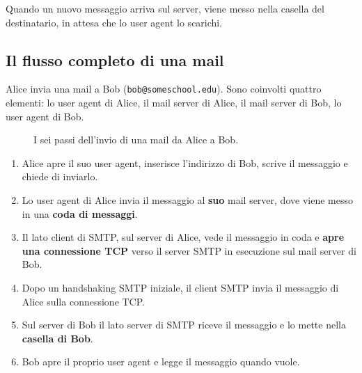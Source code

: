 Quando un nuovo messaggio arriva sul server, viene messo nella casella del destinatario, in attesa
che lo user agent lo scarichi.

\subsection{Il flusso completo di una mail}

Alice invia una mail a Bob (\texttt{bob@someschool.edu}). Sono coinvolti quattro elementi: lo user agent
di Alice, il mail server di Alice, il mail server di Bob, lo user agent di Bob.

\begin{figure}[H]
\centering
{}
\caption{I sei passi dell'invio di una mail da Alice a Bob.}
\end{figure}

\begin{enumerate}
    \item Alice apre il suo user agent, inserisce l'indirizzo di Bob, scrive il messaggio e chiede di inviarlo.
    \item Lo user agent di Alice invia il messaggio al \textbf{suo} mail server, dove viene messo in una
          \textbf{coda di messaggi}.
    \item Il lato client di SMTP, sul server di Alice, vede il messaggio in coda e \textbf{apre una connessione
          TCP} verso il server SMTP in esecuzione sul mail server di Bob.
    \item Dopo un handshaking SMTP iniziale, il client SMTP invia il messaggio di Alice sulla connessione TCP.
    \item Sul server di Bob il lato server di SMTP riceve il messaggio e lo mette nella \textbf{casella di Bob}.
    \item Bob apre il proprio user agent e legge il messaggio quando vuole.
\end{enumerate}

